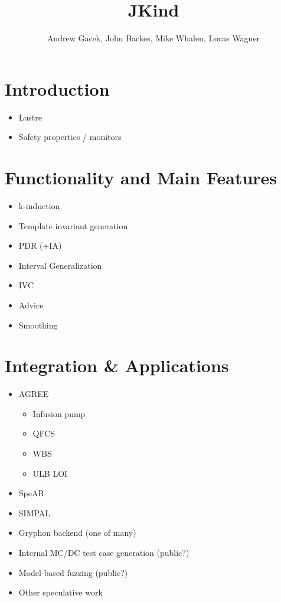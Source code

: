 \documentclass{article}
\title{JKind}
\author{Andrew Gacek, John Backes, Mike Whalen, Lucas Wagner}
\begin{document}
\maketitle

\section{Introduction}

\begin{itemize}
\item Lustre
\item Safety properties / monitors
\end{itemize}

\section{Functionality and Main Features}

\begin{itemize}
\item k-induction
\item Template invariant generation
\item PDR (+IA)
\item Interval Generalization
\item IVC
\item Advice
\item Smoothing
\end{itemize}

\section{Integration \& Applications}

\begin{itemize}
\item AGREE
  \begin{itemize}
  \item Infusion pump
  \item QFCS
  \item WBS
  \item ULB LOI
  \end{itemize}
\item SpeAR~\cite{fifarek2017nfm}
\item SIMPAL~\cite{wagner2017spin}
\item Gryphon backend (one of many)
\item Internal MC/DC test case generation (public?)
\item Model-based fuzzing (public?)
\item Other speculative work
\end{itemize}
\end{document}
